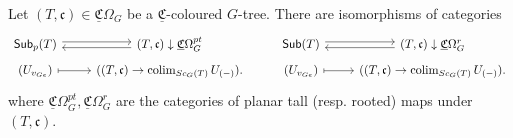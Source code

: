 \documentclass[a4paper,10pt
,draft
]{article}%
\begin{document}
\begin{lemma}[{cf. \cite[Prop. 3.41]{BP17}}]
      Let $(T,\mathfrak c) \in \underline{\mathfrak C}\Omega_G$ be a $\underline{\mathfrak C}$-coloured $G$-tree.
      There are isomorphisms of categories
      \begin{equation}
            \label{SUB_EQUIV_EQ}
            \begin{tikzcd}[row sep = 4pt]
                  \mathsf{Sub}_p(T) \arrow[r, shift left]
                  &
                  (T, \mathfrak c) \downarrow \underline{\mathfrak C}\Omega_G^{pt}
                  \arrow[l, shift left]
                  &
                  \mathsf{Sub}(T) \arrow[r, shift left]
                  &
                  (T, \mathfrak c) \downarrow \underline{\mathfrak C}\Omega_G^{r}
                  \arrow[l, shift left]                  
                  \\
                  (U_{v_{Ge}}) \arrow[r, mapsto]
                  &
                  ((T, \mathfrak c) \to \colim_{Sc_G(T)}U_{(-)}).
                  &
                  (U_{v_{Ge}}) \arrow[r, mapsto]
                  &
                  ((T, \mathfrak c) \to \colim_{Sc_G(T)}U_{(-)}).
            \end{tikzcd}
      \end{equation}
      where $\underline{\mathfrak C}\Omega_G^{pt}, \underline{\mathfrak C}\Omega_G^{r}$ are the categories of planar tall (resp. rooted) maps under $(T, \mathfrak c)$. 
\end{lemma}
\end{document}
